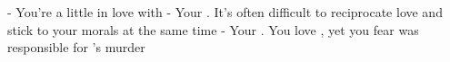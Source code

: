 \documentclass[char]{Pestilence}
\begin{document}
\begin{contacts}
	\contact{\cOutsider{}} - You're a little in love with \cOutsider{\them}
	\contact{\cElder{}} - Your \cElder{\parent}. It's often difficult to reciprocate \cElder{\their} love and stick to your morals at the same time
	\contact{\cApprentice{}} - Your \cApprentice{\sibling}. You love \cApprentice{\them}, yet you fear \cApprentice{\they} was responsible for \cOutsider{}'s murder

\end{contacts}
\end{document}
